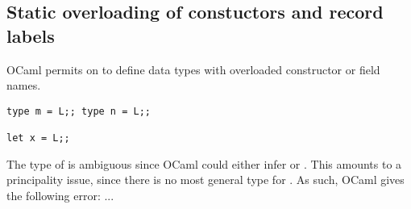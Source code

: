 \documentclass[acmsmall,screen,nonacm]{acmart}
\begin{document}




\subsection{Static overloading of constuctors and record labels}

OCaml permits on to define data types with overloaded constructor or field
names.
\begin{lstlisting}
type m = L;; type n = L;;

let x = L;;
\end{lstlisting}
The type of  is ambiguous since OCaml could either infer  or
. This amounts to a principality issue, since there is no most
general type for . As such, OCaml gives the following error: ...
\end{document}
